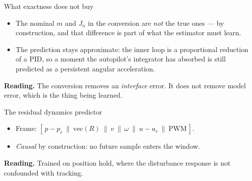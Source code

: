 \documentclass[10pt]{beamer}
\newcommand{\takeaway}[1]{\par\vfill{\footnotesize\textbf{Reading.} #1\par}}
\begin{document}
\begin{frame}{What exactness does not buy}
  \begin{itemize}
    \item The nominal $m$ and $J_n$ in the conversion are \emph{not} the true
      ones --- by construction, and that difference is part of what the
      estimator must learn.
    \item The prediction stays approximate: the inner loop is a proportional
      reduction of a PID, so a moment the autopilot's integrator has absorbed
      is still predicted as a persistent angular acceleration.
  \end{itemize}
  \takeaway{The conversion removes an \emph{interface} error. It does not
    remove model error, which is the thing being learned.}
\end{frame}

\begin{frame}{The residual dynamics predictor}
  \centering
  \vspace{2pt}
  \begin{itemize}
    \item Frame: $[\,p-p_r\ \|\ \mathrm{vec}(R)\ \|\ v\ \|\ \omega\ \|\
      u-u_r\ \|\ \mathrm{PWM}\,]$.
    \item \emph{Causal} by construction: no future sample enters the window.
  \end{itemize}
  \takeaway{Trained on position hold, where the disturbance response is not
    confounded with tracking.}
\end{frame}
\end{document}
